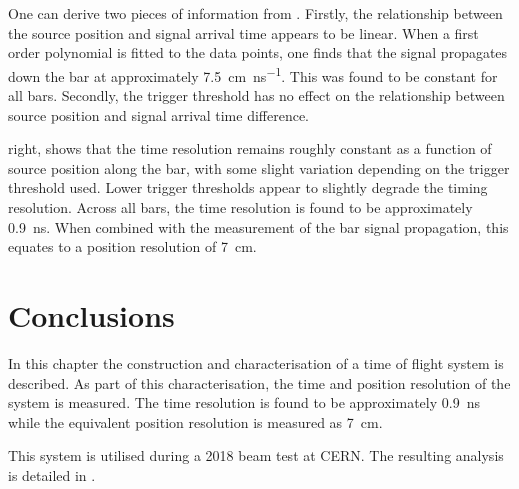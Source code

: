 One can derive two pieces of information from .
Firstly, the relationship between the source position and signal arrival time appears to be linear.
When a first order polynomial is fitted to the data points, one finds that the signal propagates down the bar at approximately \SI{7.5}{\cm\per\nano\second}.
This was found to be constant for all bars.
Secondly, the trigger threshold has no effect on the relationship between source position and signal arrival time difference.

 right, shows that the time resolution remains roughly constant as a function of source position along the bar, with some slight variation depending on the trigger threshold used.
Lower trigger thresholds appear to slightly degrade the timing resolution.
Across all bars, the time resolution is found to be approximately \SI{0.9}{\nano\second}.
When combined with the measurement of the bar signal propagation, this equates to a position resolution of \SI{7}{\cm}.

\section{Conclusions}
\label{sec:hptpc_dtof_characterisation:conclusions}

In this chapter the construction and characterisation of a time of flight system is described. 
As part of this characterisation, the time and position resolution of the system is measured.
The time resolution is found to be approximately \SI{0.9}{\ns} while the equivalent position resolution is measured as \SI{7}{\cm}.

This system is utilised during a 2018 beam test at CERN.
The resulting analysis is detailed in .
